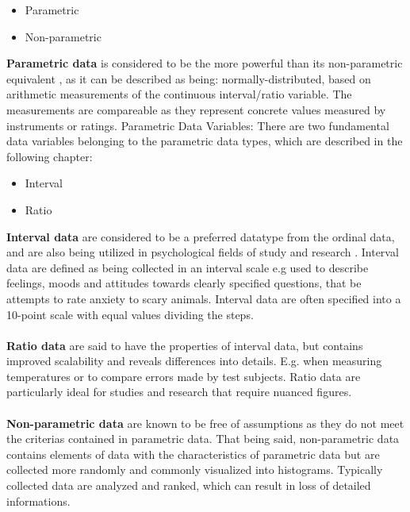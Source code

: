 \begin{itemize}
\item Parametric
\item Non-parametric
\end{itemize}
\textbf{Parametric data} is considered to be the more powerful than its non-parametric equivalent \citep[page 21]{Design}, as it can be described as being: normally-distributed, based on arithmetic measurements of the continuous interval/ratio variable. The measurements are compareable as they represent concrete values measured by instruments or ratings.
Parametric Data Variables:
There are two fundamental data variables belonging to the parametric data types, which are described in the following chapter:
\begin{itemize}
\item Interval
\item Ratio 
\end{itemize}
\textbf{Interval data} are considered to be a preferred datatype from the ordinal data, and are also being utilized in psychological fields of study and research \citep[page 8]{Design}. Interval data are defined as being collected in an interval scale e.g used to describe feelings, moods and attitudes towards clearly specified questions, that be attempts to rate anxiety to scary animals. Interval data are often specified into a 10-point scale with equal values dividing the steps.\\\\
\textbf{Ratio data} are said to have the properties of interval data, but contains improved scalability and reveals differences into details. E.g. when measuring temperatures or to compare errors made by test subjects. Ratio data are particularly ideal for studies and research that require nuanced figures.\\\\
\textbf{Non-parametric data} are known to be free of assumptions as they do not meet the criterias contained in parametric data. That being said, non-parametric data contains elements of data with the characteristics of parametric data but are collected more randomly and commonly visualized into histograms. Typically collected data are analyzed and ranked, which can result in loss of detailed informations. 
